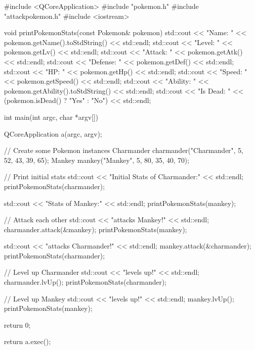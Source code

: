 \begin{cppcode}
    #include <QCoreApplication>
    #include "pokemon.h"
    #include "attackpokemon.h"
    #include <iostream>

    void printPokemonStats(const Pokemon& pokemon) {
            std::cout << "Name: " << pokemon.getName().toStdString() << std::endl;
            std::cout << "Level: " << pokemon.getLv() << std::endl;
            std::cout << "Attack: " << pokemon.getAtk() << std::endl;
            std::cout << "Defense: " << pokemon.getDef() << std::endl;
            std::cout << "HP: " << pokemon.getHp() << std::endl;
            std::cout << "Speed: " << pokemon.getSpeed() << std::endl;
            std::cout << "Ability: " << pokemon.getAbility().toStdString() << std::endl;
            std::cout << "Is Dead: " << (pokemon.isDead() ? "Yes" : "No") << std::endl;
        }

    int main(int argc, char *argv[])
    {
            QCoreApplication a(argc, argv);

            // Create some Pokemon instances
            Charmander charmander("Charmander", 5, 52, 43, 39, 65);
            Mankey mankey("Mankey", 5, 80, 35, 40, 70);

            // Print initial stats
            std::cout << "Initial Stats of Charmander:" << std::endl;
            printPokemonStats(charmander);

            std::cout << "\nInitial Stats of Mankey:" << std::endl;
            printPokemonStats(mankey);

            // Attack each other
            std::cout << "\nCharmander attacks Mankey!" << std::endl;
            charmander.attack(&mankey);
            printPokemonStats(mankey);

            std::cout << "\nMankey attacks Charmander!" << std::endl;
            mankey.attack(&charmander);
            printPokemonStats(charmander);

            // Level up Charmander
            std::cout << "\nCharmander levels up!" << std::endl;
            charmander.lvUp();
            printPokemonStats(charmander);

            // Level up Mankey
            std::cout << "\nMankey levels up!" << std::endl;
            mankey.lvUp();
            printPokemonStats(mankey);

            return 0;

            return a.exec();
        }
\end{cppcode}

